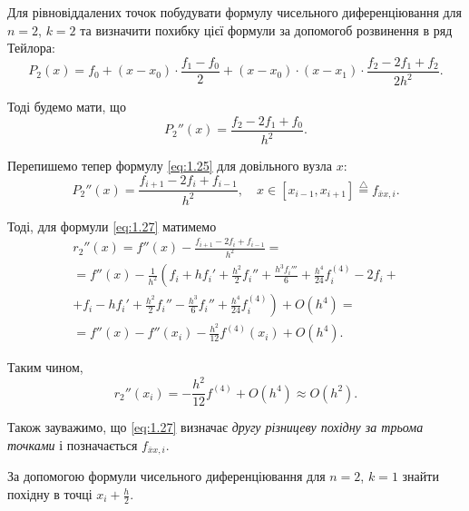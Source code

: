 \begin{example}
	Для рівновіддалених точок побудувати формулу чисельного диференціювання для $n = 2$, $k = 2$ та визначити похибку цієї формули за допомогоб розвинення в ряд Тейлора:
	\begin{equation*}
		P_2(x) = f_0 + (x - x_0) \cdot \frac{f_1 - f_0}{2} + (x - x_0) \cdot (x - x_1) \cdot \frac{f_2 - 2 f_1 + f_2}{2 h^2}.
	\end{equation*}

	Тоді будемо мати, що 
	\begin{equation}
		\label{eq:1.25}
		P_2''(x) = \frac{f_2 - 2 f_1 + f_0}{h^2}.
	\end{equation}

	Перепишемо тепер формулу \eqref{eq:1.25} для довільного вузла $x$:
	\begin{equation}
		\label{eq:1.27}
		P_2''(x) = \frac{f_{i + 1} - 2 f_i + f_{i - 1}}{h^2}, \quad x \in [x_{i - 1}, x_{i + 1}] \overset{\triangle}{=} f_{\bar x x, i}.
	\end{equation}	

	Тоді, для формули \eqref{eq:1.27} матимемо
	\begin{multline*}
		r_2''(x) = f''(x) - \frac{f_{i + 1} - 2 f_i + f_{i - 1}}{h^2} = \\ = f''(x) - \frac{1}{h^2} \left( f_i + h f_i' + \frac{h^2}{2} f_i'' + \frac{h^3 f_i'''}{6} + \frac{h^4}{24} f_i^{(4)} - 2f_i \right. + \\ \left. + f_i - h f_i' + \frac{h^2}{2} f_i'' - \frac{h^3}{6} f_i''  + \frac{h^4}{24} f_i^{(4)} \right) + O(h^4) = \\ = f''(x) - f''(x_i) - \frac{h^2}{12} f^{(4)}(x_i) + O(h^4).
	\end{multline*}

	Таким чином, 
	\begin{equation*}
		r_2''(x_i) = -\frac{h^2}{12} f^{(4)} + O(h^4) \approx O(h^2).
	\end{equation*}
\end{example}

Також зауважимо, що \eqref{eq:1.27} визначає \textit{другу різницеву похідну за трьома точками}
 і позначається $f_{\bar x x,i}$.

\begin{problem}
	За допомогою формули чисельного диференціювання для $n = 2$, $k = 1$ знайти похідну в точці $x_i + \frac{h}{2}$.
\end{problem}

% 
